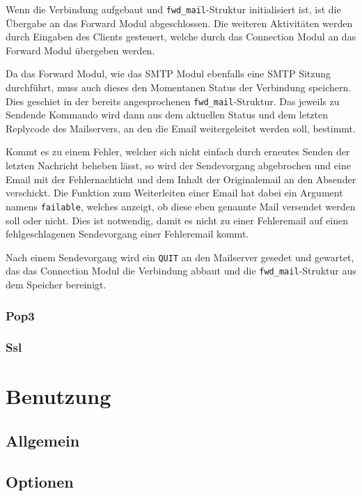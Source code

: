 \documentclass[final,a4paper,11pt,notitlepage,halfparskip]{scrreprt}
\begin{document}
Wenn die Verbindung aufgebaut und \texttt{fwd\_mail}-Struktur initialisiert ist,
ist die Übergabe an das Forward Modul abgeschlossen. Die weiteren Aktivitäten
werden durch Eingaben des Clients gesteuert, welche durch das Connection Modul
an das Forward Modul übergeben werden.

Da das Forward Modul, wie das SMTP Modul ebenfalls eine SMTP Sitzung
durchführt, muss auch dieses den Momentanen Status der Verbindung speichern.
Dies geschiet in der bereits angesprochenen \texttt{fwd\_mail}-Struktur. Das
jeweils zu Sendende Kommando wird dann aus dem aktuellen Status und dem letzten
Replycode des Mailservers, an den die Email weitergeleitet werden soll,
bestimmt.

Kommt es zu einem Fehler, welcher sich nicht einfach durch erneutes Senden der
letzten Nachricht beheben lässt, so wird der Sendevorgang abgebrochen und eine
Email mit der Fehlernachticht und dem Inhalt der Originalemail an den Absender
verschickt. Die Funktion zum Weiterleiten einer Email hat dabei ein Argument
namens \texttt{failable}, welches anzeigt, ob diese eben genannte Mail versendet
werden soll oder nicht. Dies ist notwendig, damit es nicht zu einer Fehleremail
auf einen fehlgeschlagenen Sendevorgang einer Fehleremail kommt.

Nach einem Sendevorgang wird ein \texttt{QUIT} an den Mailserver gesedet und
gewartet, das das Connection Modul die Verbindung abbaut und die
\texttt{fwd\_mail}-Struktur aus dem Speicher bereinigt.


\subsection{Pop3}


\subsection{Ssl}

\chapter{Benutzung}

\section{Allgemein}
\section{Optionen}
\end{document}
